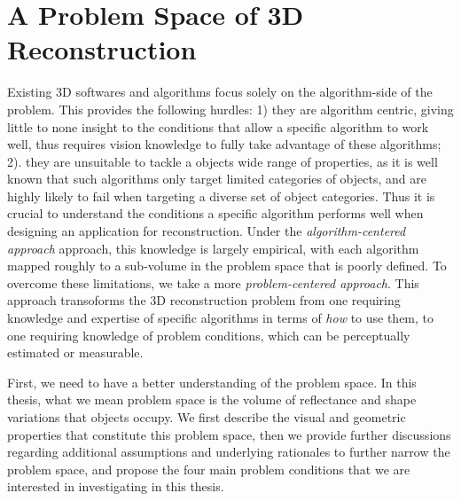 
\chapter{A Problem Space of 3D Reconstruction}
\label{ch:3DRecon_ProbSpace}
Existing 3D softwares and algorithms focus solely on the algorithm-side of the problem. This provides the following hurdles: 1) they are algorithm centric, giving little to none insight to the conditions that allow a specific algorithm to work well, thus requires vision knowledge to fully take advantage of these algorithms; 2). they are unsuitable to tackle a objects wide range of properties, as it is well known that such algorithms only target limited categories of objects, and are highly likely to fail when targeting a diverse set of object categories. Thus it is crucial to understand the conditions a specific algorithm performs well when designing an application for reconstruction. Under the \textit{algorithm-centered approach} approach, this knowledge is largely empirical, with each algorithm mapped roughly to a sub-volume in the problem space that is poorly defined. To overcome these limitations, we take a more \textit{problem-centered approach}. This approach transoforms the 3D reconstruction problem from one requiring knowledge and expertise of specific algorithms in terms of \textit{how} to use them, to one requiring knowledge of problem conditions, which can be perceptually estimated or measurable.

First, we need to have a better understanding of the problem space. In this thesis, what we mean problem space is the volume of reflectance and shape variations that objects occupy. We first describe the visual and geometric properties that constitute this problem space, then we provide further discussions regarding additional assumptions and underlying rationales to further narrow the problem space, and propose the four main problem conditions that we are interested in investigating in this thesis.

